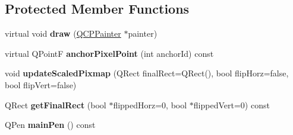 \subsection*{Protected Member Functions}
\begin{DoxyCompactItemize}
\item 
\hypertarget{class_q_c_p_item_pixmap_a879e8076c2db01a38b34cfa73ec95d2f}{}\label{class_q_c_p_item_pixmap_a879e8076c2db01a38b34cfa73ec95d2f} 
virtual void {\bfseries draw} (\hyperlink{class_q_c_p_painter}{Q\+C\+P\+Painter} $\ast$painter)
\item 
\hypertarget{class_q_c_p_item_pixmap_a24d4072c0e50c608ddcc0840d853fc03}{}\label{class_q_c_p_item_pixmap_a24d4072c0e50c608ddcc0840d853fc03} 
virtual Q\+PointF {\bfseries anchor\+Pixel\+Point} (int anchor\+Id) const
\item 
\hypertarget{class_q_c_p_item_pixmap_a8bced3027b326b290726cd1979c7cfc6}{}\label{class_q_c_p_item_pixmap_a8bced3027b326b290726cd1979c7cfc6} 
void {\bfseries update\+Scaled\+Pixmap} (Q\+Rect final\+Rect=Q\+Rect(), bool flip\+Horz=false, bool flip\+Vert=false)
\item 
\hypertarget{class_q_c_p_item_pixmap_a4e7d803e5093c457a109f8fae56677c2}{}\label{class_q_c_p_item_pixmap_a4e7d803e5093c457a109f8fae56677c2} 
Q\+Rect {\bfseries get\+Final\+Rect} (bool $\ast$flipped\+Horz=0, bool $\ast$flipped\+Vert=0) const
\item 
\hypertarget{class_q_c_p_item_pixmap_aad6dddd67163831538d40023a98a9fe7}{}\label{class_q_c_p_item_pixmap_aad6dddd67163831538d40023a98a9fe7} 
Q\+Pen {\bfseries main\+Pen} () const
\end{DoxyCompactItemize}
